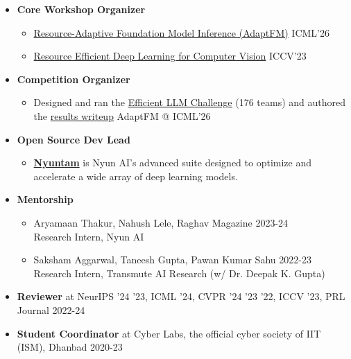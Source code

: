 \begin{itemize}
	\setlength\itemsep{0.3em}
    \item {
    \textbf{Core Workshop Organizer}
    \begin{itemize}
        \item \href{https://adaptfm.gitlab.io/}{Resource-Adaptive Foundation Model Inference (AdaptFM)} \hfill ICML'26
        \item \href{https://sites.google.com/corp/view/rcv2023/home}{Resource Efficient Deep Learning for Computer Vision} \hfill ICCV'23
    \end{itemize}
    }
    \item {
    \textbf{Competition Organizer}
    \begin{itemize}
        \item Designed and ran the \href{https://adaptfm.gitlab.io/competition-results/}{Efficient LLM Challenge} (176 teams) and authored the \href{https://adaptfm.gitlab.io/competition-results/}{results writeup} \hfill AdaptFM @ ICML'26
    \end{itemize}
    }
    \item {
    \textbf{Open Source Dev Lead}
    \begin{itemize}
        \item \href{https://github.com/nyunAI/nyuntam}{\bf Nyuntam}{ is Nyun AI's advanced suite designed to optimize and accelerate a wide array of deep learning models.} 
    \end{itemize}
    }
    \item {
    \textbf{Mentorship}
    \begin{itemize}
    \setlength\itemsep{0.2em}
        \item Aryamaan Thakur, Nahush Lele, Raghav Magazine \hfill 2023-24 \\
    Research Intern, Nyun AI 
        \item Saksham Aggarwal, Taneesh Gupta, Pawan Kumar Sahu \hfill 2022-23 \\
        Research Intern, Transmute AI Research (w/ Dr. Deepak K. Gupta)
    \end{itemize}
    
    }
    \item {\textbf{Reviewer} at NeurIPS '24 '23, ICML '24, CVPR '24 '23 '22, ICCV '23, PRL Journal \hfill 2022-24}
        
    \item {\textbf{Student Coordinator} at Cyber Labs, the official cyber society of IIT (ISM), Dhanbad \hfill 2020-23}
\end{itemize}    

